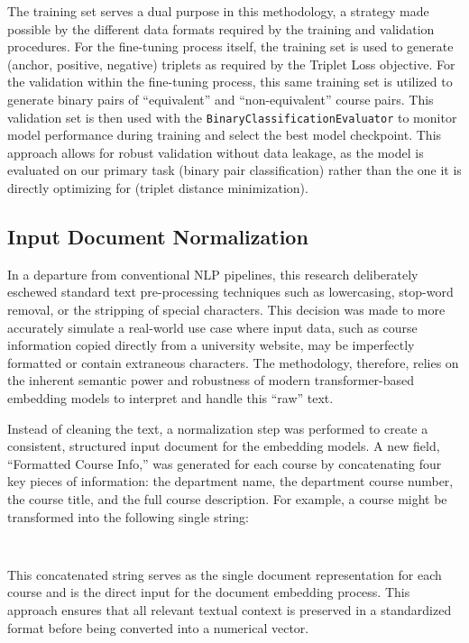 The training set serves a dual purpose in this methodology, a strategy made possible by the different data formats required by the training and validation procedures. For the fine-tuning process itself, the training set is used to generate (anchor, positive, negative) triplets as required by the Triplet Loss objective. For the validation within the fine-tuning process, this same training set is utilized to generate binary pairs of ``equivalent'' and ``non-equivalent'' course pairs. This validation set is then used with the \verb|BinaryClassificationEvaluator| to monitor model performance during training and select the best model checkpoint. This approach allows for robust validation without data leakage, as the model is evaluated on our primary task (binary pair classification) rather than the one it is directly optimizing for (triplet distance minimization).

\subsection{Input Document Normalization}
In a departure from conventional NLP pipelines, this research deliberately eschewed standard text pre-processing techniques such as lowercasing, stop-word removal, or the stripping of special characters. This decision was made to more accurately simulate a real-world use case where input data, such as course information copied directly from a university website, may be imperfectly formatted or contain extraneous characters. The methodology, therefore, relies on the inherent semantic power and robustness of modern transformer-based embedding models to interpret and handle this ``raw'' text.

Instead of cleaning the text, a normalization step was performed to create a consistent, structured input document for the embedding models. A new field, ``Formatted Course Info,'' was generated for each course by concatenating four key pieces of information: the department name, the department course number, the course title, and the full course description. For example, a course might be transformed into the following single string:
\begin{lstlisting}
    
\end{lstlisting}
This concatenated string serves as the single document representation for each course and is the direct input for the document embedding process. This approach ensures that all relevant textual context is preserved in a standardized format before being converted into a numerical vector.

